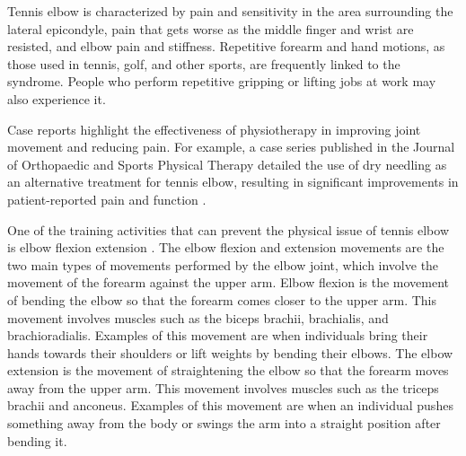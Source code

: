 Tennis elbow is characterized by pain and sensitivity in the area surrounding the lateral epicondyle, pain that gets worse as the middle finger and wrist are resisted, and elbow pain and stiffness. Repetitive forearm and hand motions, as those used in tennis, golf, and other sports, are frequently linked to the syndrome. People who perform repetitive gripping or lifting jobs at work may also experience it.

Case reports highlight the effectiveness of physiotherapy in improving joint movement and reducing pain. For example, a case series published in the Journal of Orthopaedic and Sports Physical Therapy detailed the use of dry needling as an alternative treatment for tennis elbow, resulting in significant improvements in patient-reported pain and function \cite{TennisElbow2}.

One of the training activities that can prevent the physical issue of tennis elbow is elbow flexion extension \cite{ElbowFlexionExtension}. The elbow flexion and extension movements are the two main types of movements performed by the elbow joint, which involve the movement of the forearm against the upper arm. Elbow flexion is the movement of bending the elbow so that the forearm comes closer to the upper arm. This movement involves muscles such as the biceps brachii, brachialis, and brachioradialis. Examples of this movement are when individuals bring their hands towards their shoulders or lift weights by bending their elbows. The elbow extension is the movement of straightening the elbow so that the forearm moves away from the upper arm. This movement involves muscles such as the triceps brachii and anconeus. Examples of this movement are when an individual pushes something away from the body or swings the arm into a straight position after bending it.

